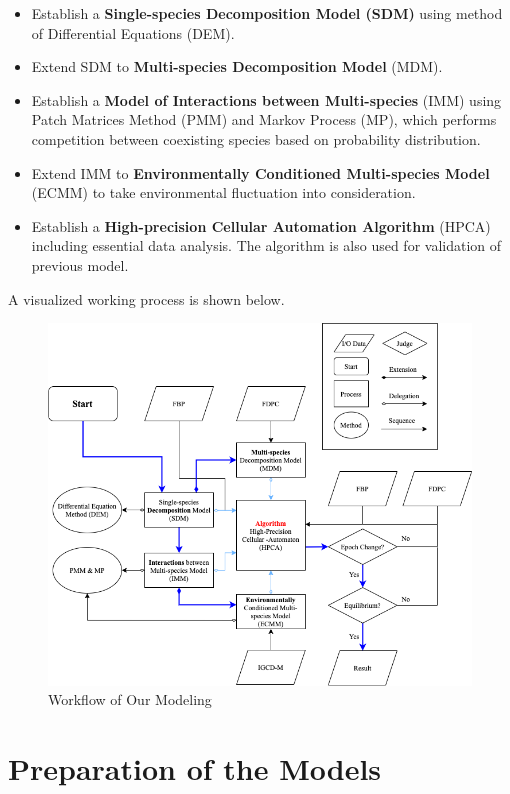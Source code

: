 \documentclass[12pt]{article}
\begin{document}
\begin{itemize}
	\item Establish a \textbf{Single-species Decomposition Model (SDM)} using method of Differential Equations (DEM). 
	\item Extend SDM to \textbf{Multi-species Decomposition Model} (MDM).
	\item Establish a \textbf{Model of Interactions between Multi-species} (IMM) using Patch Matrices Method (PMM) and Markov Process (MP), which performs competition between coexisting species based on probability distribution.
	\item Extend IMM to \textbf{Environmentally Conditioned Multi-species Model} (ECMM) to take environmental fluctuation into consideration.
	\item Establish a \textbf{High-precision Cellular Automation Algorithm} (HPCA) including essential data analysis. The algorithm is also used for validation of previous model.
\end{itemize}

A visualized working process is shown below.
\begin{figure}[H]%
	\small
	\centering
	\includegraphics[width=15cm]{./pictures/workflow.png}
	\caption{Workflow of Our Modeling}\label{jj}
\end{figure}


\section{Preparation of the Models}
\end{document}
